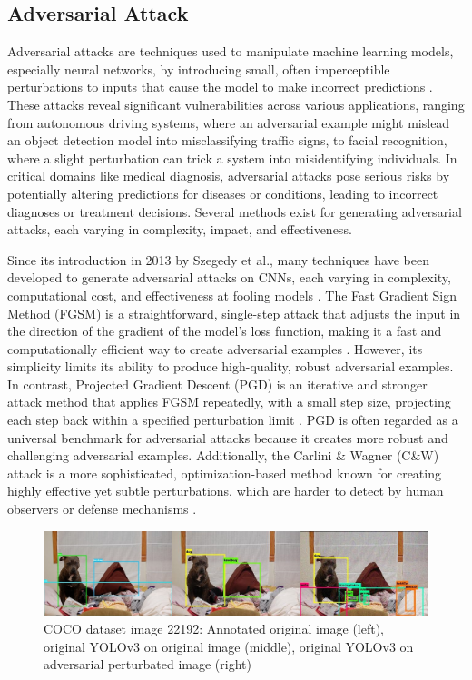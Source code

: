 \documentclass[journal,onecolumn,12pt]{IEEEtran}
\begin{document}
\subsection{Adversarial Attack}
Adversarial attacks are techniques used to manipulate machine learning models, especially neural networks, by introducing small, often imperceptible perturbations to inputs that cause the model to make incorrect predictions \cite{Li_2022}. These attacks reveal significant vulnerabilities across various applications, ranging from autonomous driving systems, where an adversarial example might mislead an object detection model into misclassifying traffic signs, to facial recognition, where a slight perturbation can trick a system into misidentifying individuals. In critical domains like medical diagnosis, adversarial attacks pose serious risks by potentially altering predictions for diseases or conditions, leading to incorrect diagnoses or treatment decisions. Several methods exist for generating adversarial attacks, each varying in complexity, impact, and effectiveness. 

Since its introduction in 2013 by Szegedy et al., many techniques have been developed to generate adversarial attacks on CNNs, each varying in complexity, computational cost, and effectiveness at fooling models \cite{szegedy2014intriguingpropertiesneuralnetworks}. The Fast Gradient Sign Method (FGSM) is a straightforward, single-step attack that adjusts the input in the direction of the gradient of the model's loss function, making it a fast and computationally efficient way to create adversarial examples \cite{goodfellow2015explainingharnessingadversarialexamples}. However, its simplicity limits its ability to produce high-quality, robust adversarial examples. In contrast, Projected Gradient Descent (PGD) is an iterative and stronger attack method that applies FGSM repeatedly, with a small step size, projecting each step back within a specified perturbation limit \cite{madry2019deeplearningmodelsresistant}. PGD is often regarded as a universal benchmark for adversarial attacks because it creates more robust and challenging adversarial examples. Additionally, the Carlini \& Wagner (C\&W) attack is a more sophisticated, optimization-based method known for creating highly effective yet subtle perturbations, which are harder to detect by human observers or defense mechanisms \cite{carlini2017evaluatingrobustnessneuralnetworks}.


\begin{figure}
    \centering
    \captionsetup{justification=centering}
    \includegraphics[width=1.0\linewidth]{figures/dog1.jpg}
    \caption{COCO dataset image 22192: Annotated original image (left), original YOLOv3 on original image (middle), original YOLOv3 on adversarial perturbated image (right) }
    \label{fig:dog1}
\end{figure}
\end{document}
